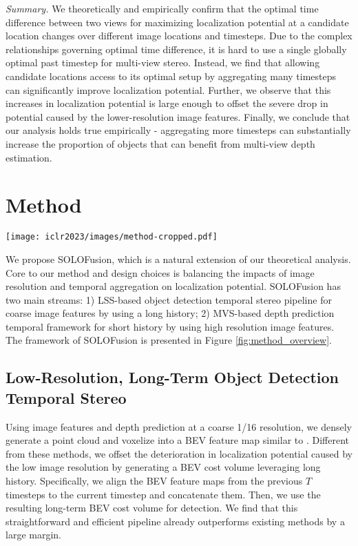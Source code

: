 \documentclass[runningheads, hyperfootnotes=false]{article}
\begin{document}
\noindent\textit{Summary.} We theoretically and empirically confirm that the optimal time difference between two views for maximizing localization potential at a candidate location changes over different image locations and timesteps. Due to the complex relationships governing optimal time difference, it is hard to use a single globally optimal past timestep for multi-view stereo. Instead, we find that allowing candidate locations access to its optimal setup by aggregating many timesteps can significantly improve localization potential. Further, we observe that this increases in localization potential is large enough to offset the severe drop in potential caused by the lower-resolution image features. Finally, we conclude that our analysis holds true empirically - aggregating more timesteps can substantially increase the proportion of objects that can benefit from multi-view depth estimation. \section{Method}
\begin{figure*}[t]
  \centering
  \texttt{[image: iclr2023/images/method-cropped.pdf]}
  \captionsetup{aboveskip=0pt}\captionsetup{belowskip=0pt}\caption{The framework of SOLOFusion.}
  \label{fig:method_overview}
\end{figure*} We propose SOLOFusion, which is a natural extension of our theoretical analysis. Core to our method and design choices is balancing the impacts of image resolution and temporal aggregation on localization potential. SOLOFusion has two main streams: 1) LSS-based object detection temporal stereo pipeline for coarse image features by using a long history; 2) MVS-based depth prediction temporal framework for short history by using high resolution image features. The framework of SOLOFusion is presented in Figure \ref{fig:method_overview}. 

\subsection{Low-Resolution, Long-Term Object Detection Temporal Stereo}\label{sec:method_long}
Using image features and depth prediction at a coarse 1/16 resolution, we densely generate a point cloud and voxelize into a BEV feature map similar to \citep{huang2021bevdet,li2022bevdepth}. Different from these methods, we offset the deterioration in localization potential caused by the low image resolution by generating a BEV cost volume leveraging long history. Specifically, we align the BEV feature maps from the previous $T$ timesteps to the current timestep and concatenate them. Then, we use the resulting long-term BEV cost volume for detection. We find that this straightforward and efficient pipeline already outperforms existing methods by a large margin.
\end{document}

